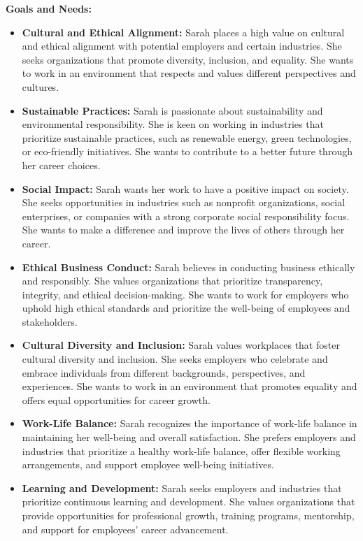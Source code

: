 \noindent\textbf{Goals and Needs:}

\begin{itemize}
    \item \textbf{Cultural and Ethical Alignment:} Sarah places a high value on cultural and ethical alignment with potential employers and certain industries. She seeks organizations that promote diversity, inclusion, and equality. She wants to work in an environment that respects and values different perspectives and cultures.
    \item \textbf{Sustainable Practices:} Sarah is passionate about sustainability and environmental responsibility. She is keen on working in industries that prioritize sustainable practices, such as renewable energy, green technologies, or eco-friendly initiatives. She wants to contribute to a better future through her career choices.
    \item \textbf{Social Impact:} Sarah wants her work to have a positive impact on society. She seeks opportunities in industries such as nonprofit organizations, social enterprises, or companies with a strong corporate social responsibility focus. She wants to make a difference and improve the lives of others through her career.
    \item \textbf{Ethical Business Conduct:} Sarah believes in conducting business ethically and responsibly. She values organizations that prioritize transparency, integrity, and ethical decision-making. She wants to work for employers who uphold high ethical standards and prioritize the well-being of employees and stakeholders.
    \item \textbf{Cultural Diversity and Inclusion:} Sarah values workplaces that foster cultural diversity and inclusion. She seeks employers who celebrate and embrace individuals from different backgrounds, perspectives, and experiences. She wants to work in an environment that promotes equality and offers equal opportunities for career growth.
    \item \textbf{Work-Life Balance:} Sarah recognizes the importance of work-life balance in maintaining her well-being and overall satisfaction. She prefers employers and industries that prioritize a healthy work-life balance, offer flexible working arrangements, and support employee well-being initiatives.
    \item \textbf{Learning and Development:} Sarah seeks employers and industries that prioritize continuous learning and development. She values organizations that provide opportunities for professional growth, training programs, mentorship, and support for employees' career advancement.
\end{itemize}

